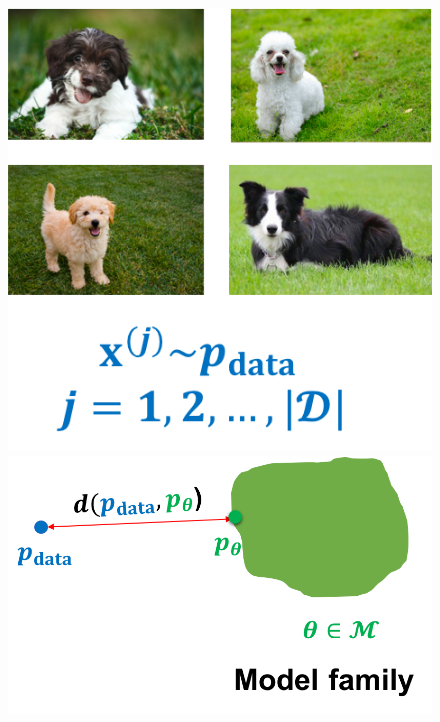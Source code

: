 \begin{figure}[H]
	\centering
	\begin{minipage}{0.49\linewidth}
		\centering
		\includegraphics[scale=0.518]{pix/dgm/learning_1.png}
	\end{minipage}
	\begin{minipage}{0.49\linewidth}
		\centering
		\includegraphics[scale=0.518]{pix/dgm/learning_2.png}
	\end{minipage}
\end{figure}

